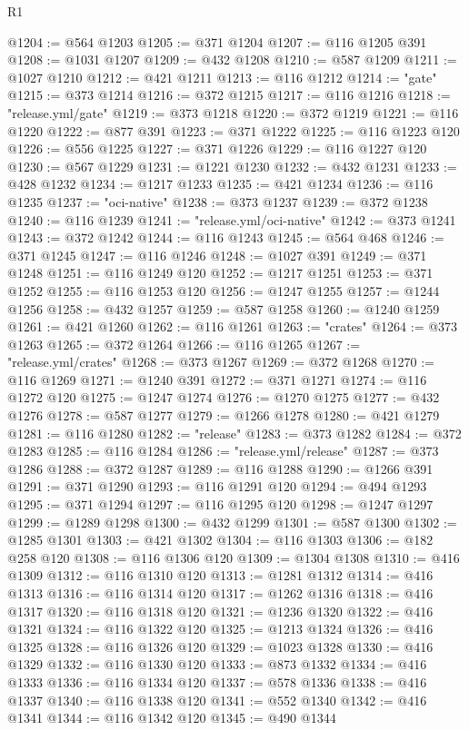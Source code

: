 \begin{lexlean}{R1}
\begin{coremodule}
@1204 := @564 @1203
@1205 := @371 @1204
@1207 := @116 @1205 @391
@1208 := @1031 @1207
@1209 := @432 @1208
@1210 := @587 @1209
@1211 := @1027 @1210
@1212 := @421 @1211
@1213 := @116 @1212
@1214 := "gate"
@1215 := @373 @1214
@1216 := @372 @1215
@1217 := @116 @1216
@1218 := "release.yml/gate"
@1219 := @373 @1218
@1220 := @372 @1219
@1221 := @116 @1220
@1222 := @877 @391
@1223 := @371 @1222
@1225 := @116 @1223 @120
@1226 := @556 @1225
@1227 := @371 @1226
@1229 := @116 @1227 @120
@1230 := @567 @1229
@1231 := @1221 @1230
@1232 := @432 @1231
@1233 := @428 @1232
@1234 := @1217 @1233
@1235 := @421 @1234
@1236 := @116 @1235
@1237 := "oci-native"
@1238 := @373 @1237
@1239 := @372 @1238
@1240 := @116 @1239
@1241 := "release.yml/oci-native"
@1242 := @373 @1241
@1243 := @372 @1242
@1244 := @116 @1243
@1245 := @564 @468
@1246 := @371 @1245
@1247 := @116 @1246
@1248 := @1027 @391
@1249 := @371 @1248
@1251 := @116 @1249 @120
@1252 := @1217 @1251
@1253 := @371 @1252
@1255 := @116 @1253 @120
@1256 := @1247 @1255
@1257 := @1244 @1256
@1258 := @432 @1257
@1259 := @587 @1258
@1260 := @1240 @1259
@1261 := @421 @1260
@1262 := @116 @1261
@1263 := "crates"
@1264 := @373 @1263
@1265 := @372 @1264
@1266 := @116 @1265
@1267 := "release.yml/crates"
@1268 := @373 @1267
@1269 := @372 @1268
@1270 := @116 @1269
@1271 := @1240 @391
@1272 := @371 @1271
@1274 := @116 @1272 @120
@1275 := @1247 @1274
@1276 := @1270 @1275
@1277 := @432 @1276
@1278 := @587 @1277
@1279 := @1266 @1278
@1280 := @421 @1279
@1281 := @116 @1280
@1282 := "release"
@1283 := @373 @1282
@1284 := @372 @1283
@1285 := @116 @1284
@1286 := "release.yml/release"
@1287 := @373 @1286
@1288 := @372 @1287
@1289 := @116 @1288
@1290 := @1266 @391
@1291 := @371 @1290
@1293 := @116 @1291 @120
@1294 := @494 @1293
@1295 := @371 @1294
@1297 := @116 @1295 @120
@1298 := @1247 @1297
@1299 := @1289 @1298
@1300 := @432 @1299
@1301 := @587 @1300
@1302 := @1285 @1301
@1303 := @421 @1302
@1304 := @116 @1303
@1306 := @182 @258 @120
@1308 := @116 @1306 @120
@1309 := @1304 @1308
@1310 := @416 @1309
@1312 := @116 @1310 @120
@1313 := @1281 @1312
@1314 := @416 @1313
@1316 := @116 @1314 @120
@1317 := @1262 @1316
@1318 := @416 @1317
@1320 := @116 @1318 @120
@1321 := @1236 @1320
@1322 := @416 @1321
@1324 := @116 @1322 @120
@1325 := @1213 @1324
@1326 := @416 @1325
@1328 := @116 @1326 @120
@1329 := @1023 @1328
@1330 := @416 @1329
@1332 := @116 @1330 @120
@1333 := @873 @1332
@1334 := @416 @1333
@1336 := @116 @1334 @120
@1337 := @578 @1336
@1338 := @416 @1337
@1340 := @116 @1338 @120
@1341 := @552 @1340
@1342 := @416 @1341
@1344 := @116 @1342 @120
@1345 := @490 @1344

\end{coremodule}
\end{lexlean}
